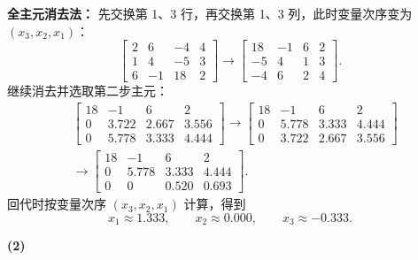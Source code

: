 \documentclass[11pt, a4paper]{ctexart}
\begin{document}
\begin{solution}
    \textbf{全主元消去法：}
    先交换第 1、3 行，再交换第 1、3 列，此时变量次序变为 $(x_3, x_2, x_1)$：
    \[
        \left[
        \begin{array}{ccc|c}
            2 & 6 & -4 & 4 \\
            1 & 4 & -5 & 3 \\
            6 & -1 & 18 & 2
        \end{array}
        \right]
        \to
        \left[
        \begin{array}{ccc|c}
            18 & -1 & 6 & 2 \\
            -5 & 4 & 1 & 3 \\
            -4 & 6 & 2 & 4
        \end{array}
        \right].
    \]
    继续消去并选取第二步主元：
    \[
        \begin{aligned}
            &\left[
            \begin{array}{ccc|c}
                18 & -1 & 6 & 2 \\
                0 & 3.722 & 2.667 & 3.556 \\
                0 & 5.778 & 3.333 & 4.444
            \end{array}
            \right]
            \to
            \left[
            \begin{array}{ccc|c}
                18 & -1 & 6 & 2 \\
                0 & 5.778 & 3.333 & 4.444 \\
                0 & 3.722 & 2.667 & 3.556
            \end{array}
            \right] \\
            &\to
            \left[
            \begin{array}{ccc|c}
                18 & -1 & 6 & 2 \\
                0 & 5.778 & 3.333 & 4.444 \\
                0 & 0 & 0.520 & 0.693
            \end{array}
            \right].
        \end{aligned}
    \]
    回代时按变量次序 $(x_3, x_2, x_1)$ 计算，得到
    \[
        x_1 \approx 1.333,\qquad
        x_2 \approx 0.000,\qquad
        x_3 \approx -0.333.
    \]

    \vspace{1em}
    \textbf{(2)}


\end{solution}
\end{document}
